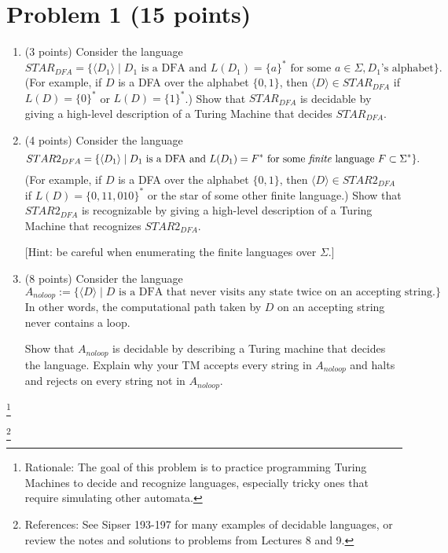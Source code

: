 \documentclass[letterpaper,11pt,twoside]{article}
\theoremstyle{plain}
\theoremstyle{definition}
\theoremstyle{remark}
\theoremstyle{restate}
\newcommand\blfootnote[1]{%
  \begingroup
  \renewcommand\thefootnote{}\footnote{#1}%
  \addtocounter{footnote}{-1}%
  \endgroup
}
\begin{document}
\clearpage
\section*{Problem 1 (15 points)}

\begin{enumerate}
    \item (3 points) Consider the language
    \[
    STAR_{DFA} = \{ \langle D_1 \rangle \; | \; D_1 \text{ is a DFA and } L(D_1) = \{a\}^* \text{ for some } a \in \Sigma, D_1\text{'s alphabet} \}.
    \]
    (For example, if $D$ is a DFA over the alphabet $\{0, 1\}$, then $\langle D \rangle \in STAR_{DFA}$ if $L(D) = \{0\}^*$ or $L(D) = \{1\}^*$.) Show that $STAR_{DFA}$ is decidable by giving a high-level description of a Turing Machine that decides $STAR_{DFA}$. 
    
    
    \item (4 points) Consider the language
    \[
    STAR2_{DFA} = \{ \langle D_1 \rangle \; | \; D_1 \text{ is a DFA and } L(D_1) = F^* \text{ for some \emph{finite} language } F \subset \Sigma^* \}.
    \]
    (For example, if $D$ is a DFA over the alphabet $\{0, 1\}$, then $\langle D \rangle \in STAR2_{DFA}$ if $L(D) = \{0, 11, 010\}^*$ or the star of some other finite language.) Show that $STAR2_{DFA}$ is recognizable by giving a high-level description of a Turing Machine that recognizes $STAR2_{DFA}$. 

    [Hint: be careful when enumerating the finite languages over $\Sigma$.]

    \item (8 points) Consider the language
    \[
    A_{noloop} := \{ \langle D \rangle \; | \; D \text{ is a DFA that never visits any state twice on an accepting string.} \}
    \]
    In other words, the computational path taken by $D$ on an accepting string never contains a loop.

    Show that $A_{noloop}$ is decidable by describing a Turing machine that decides the language. Explain why your TM accepts every string in $A_{noloop}$ and halts and rejects on every string not in $A_{noloop}$.
\end{enumerate}


    \blfootnote{ Rationale: The goal of this problem is to practice programming Turing Machines to decide and recognize languages, especially tricky ones that require simulating other automata. }
    \blfootnote{ References: See Sipser 193-197 for many examples of decidable languages, or review the notes and solutions to problems from Lectures 8 and 9. }
\end{document}
